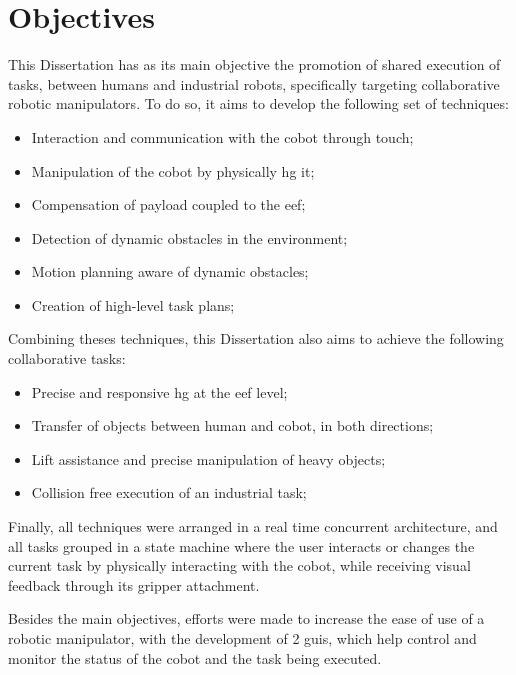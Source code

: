 \section{Objectives}

\par This Dissertation has as its main objective the promotion of shared execution of tasks, between humans and industrial robots, specifically targeting collaborative robotic manipulators. To do so, it aims to develop the following set of techniques:

\begin{itemize}
    \item Interaction and communication with the cobot through touch;
    \item Manipulation of the cobot by physically \ac{hg} it;
    \item Compensation of payload coupled to the \ac{eef};
    \item Detection of dynamic obstacles in the environment;
    \item Motion planning aware of dynamic obstacles;
    \item Creation of high-level task plans;
\end{itemize}

\par Combining theses techniques, this Dissertation also aims to achieve the following collaborative tasks:

\begin{itemize}
    \item Precise and responsive \ac{hg} at the \ac{eef} level;
    \item Transfer of objects between human and cobot, in both directions;
    \item Lift assistance and precise manipulation of heavy objects;
    \item Collision free execution of an industrial task;
\end{itemize}

\par Finally, all techniques were arranged in a real time concurrent architecture, and all tasks grouped in a state machine where the user interacts or changes the current task by physically interacting with the cobot, while receiving visual feedback through its gripper attachment.

\par Besides the main objectives, efforts were made to increase the ease of use of a robotic manipulator, with the development of 2 \acp{gui}, which help control and monitor the status of the cobot and the task being executed.





